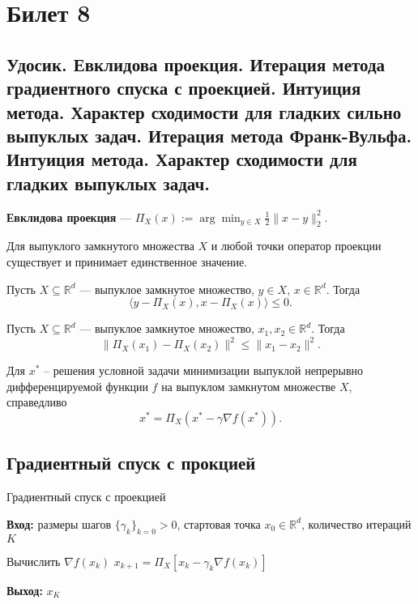 \section{Билет 8}

\subsection{Удосик. Евклидова проекция. Итерация метода градиентного спуска с проекцией.
    Интуиция метода. Характер сходимости для гладких сильно выпуклых
    задач. Итерация метода Франк-Вульфа. Интуиция метода. Характер сходимости для гладких выпуклых задач.}

\begin{definition}
    \textbf{Евклидова проекция} --- $\Pi_X(x) := \arg \min_{y \in X} \frac{1}{2} \|x - y\|^2_2.$
\end{definition}

\begin{theorem}
    Для выпуклого замкнутого множества $X$ и любой точки оператор проекции существует и принимает единственное значение.
\end{theorem}

\begin{theorem}
    Пусть $X \subseteq \mathbb{R}^d$ — выпуклое замкнутое множество, $y \in X$, $x \in \mathbb{R}^d$. Тогда
    $$\langle y - \Pi_X(x), x - \Pi_X(x) \rangle \leq 0.$$
\end{theorem}

\begin{theorem}
    Пусть $X \subseteq \mathbb{R}^d$ — выпуклое замкнутое множество, $x_1, x_2 \in \mathbb{R}^d$. Тогда
    $$\| \Pi_X(x_1) - \Pi_X(x_2) \|^2 \leq \|x_1 - x_2\|^2.$$
\end{theorem}

\begin{theorem}
    Для $x^*$ – решения условной задачи минимизации выпуклой непрерывно дифференцируемой функции $f$
    на выпуклом замкнутом множестве $X$, справедливо
    $$x^* = \Pi_X(x^* - \gamma \nabla f(x^*)).$$
\end{theorem}

\subsection*{Градиентный спуск с прокцией}

\begin{algorithm}[H]
    \caption{Градиентный спуск с проекцией}
    \textbf{Вход:} размеры шагов $\{\gamma_k\}_{k=0} > 0$, стартовая точка $x_0 \in \mathbb{R}^d$, количество итераций $K$
    \begin{algorithmic}[1]
        \State Вычислить $\nabla f(x_k)$
        \State $x_{k+1} = \Pi_X \left[ x_k - \gamma_k \nabla f(x_k) \right]$
        \EndFor
    \end{algorithmic}
    \textbf{Выход:} $x_K$
\end{algorithm}

